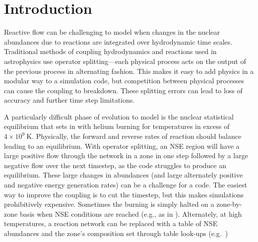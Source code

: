 \documentclass[times,modern]{aastex63}
\newcommand{\MarginPar}[1]{\marginpar{\vskip-\baselineskip\raggedright\tiny\sffamily\hrule\smallskip{\color{red}#1}\par\smallskip\hrule}}
\begin{document}

\section{Introduction}\label{Sec:Introduction}

Reactive flow can be challenging to model when changes in the
nuclear abundances due to reactions are integrated over hydrodynamic
time scales.  Traditional methods of coupling
hydrodynamics and reactions used in astrophysics use operator
splitting---each physical process acts on the output of the previous
process in alternating fashion.  This makes it easy to add physics in a modular way to a
simulation code, but competition between physical processes can cause
the coupling to breakdown.  These splitting errors can lead to loss of
accuracy and further time step limitations.

A particularly difficult phase of evolution to model is the nuclear
statistical equilibrium that sets in with helium burning for
temperatures in excess of $4\times 10^9~\mathrm{K}$.  Physically, the
forward and reverse rates of reaction should balance leading to an equilibrium.
With operator splitting, an NSE region will have a large positive flow
through the network in a zone in one step followed by a large negative
flow over the next timestep, as the code struggles to produce an
equilibrium.  These large changes in abundances (and large alternately
positive and negative energy generation rates) can be a challenge for
a code.  The easiest way to improve the coupling is to cut the
timestep, but this makes simulations prohibitively expensive.
Sometimes the burning is simply halted on a zone-by-zone basis when
NSE conditions are reached (e.g., as in \citealt{hedet}).
Alternately, at high temperatures, a reaction network can be replaced
with a table of NSE abundances and the zone's composition set through
table look-ups (e.g.\ \citealt{ma:2013}) \MarginPar{need more here}
\end{document}
